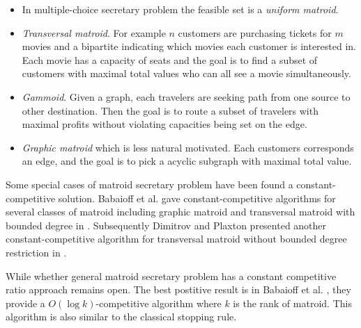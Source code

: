 \begin{itemize}
    \item In multiple-choice secretary problem the feasible set is a
        \emph{uniform matroid}.

    \item \emph{Transversal matroid}. For example $n$ customers are
        purchasing tickets for $m$ movies and a bipartite indicating
        which movies each customer is interested in. Each movie has
        a capacity of seats and the goal is to find a subset of
        customers with maximal total values who can all see a movie
        simultaneously.

    \item \emph{Gammoid}. Given a graph, each travelers are seeking
        path from one source to other destination. Then the goal is to
        route a subset of travelers with maximal profits without
        violating capacities being set on the edge.

    \item \emph{Graphic matroid} which is less natural motivated.
        Each customers corresponds an edge, and the goal is to pick
        a acyclic subgraph with maximal total value.
\end{itemize}

Some special cases of matroid secretary problem have been found a
constant-competitive solution. Babaioff et al. gave constant-competitive
algorithms for several classes of matroid including graphic matroid and
transversal matroid with bounded degree in \cite{babaioff2007matroids}.
Subsequently Dimitrov and Plaxton presented another constant-competitive
algorithm for transversal matroid without bounded degree restriction in
\cite{dimitrov2008competitive}.

While whether general matroid secretary problem has a constant
competitive ratio approach remains open. The best postitive result
is in Babaioff et al. \cite{babaioff2007matroids}, they provide
a $O(\log k)$-competitive algorithm where $k$ is the rank of matroid.
This algorithm is also similar to the classical stopping rule.


